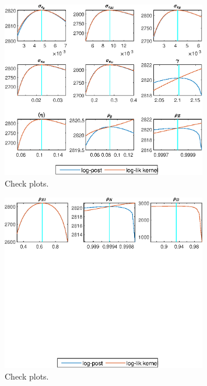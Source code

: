  
\begin{figure}[H]
\centering 
\includegraphics[width=0.80\textwidth]{BRS_growth_res/graphs/BRS_growth_res_CheckPlots1}
\caption{Check plots.}\label{Fig:CheckPlots:1}
\end{figure}
 
\begin{figure}[H]
\centering 
\includegraphics[width=0.80\textwidth]{BRS_growth_res/graphs/BRS_growth_res_CheckPlots2}
\caption{Check plots.}\label{Fig:CheckPlots:2}
\end{figure}
 
